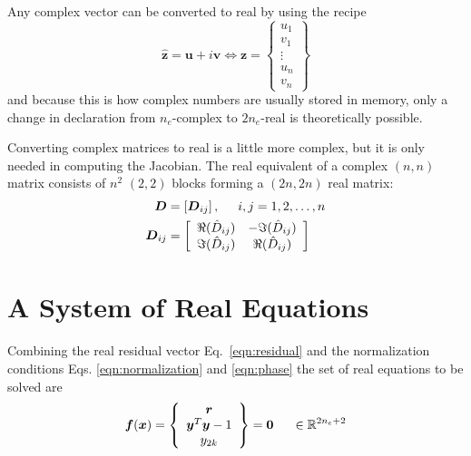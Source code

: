 \documentclass[10pt,openany,twoside]{book}
\numberwithin{equation}{section}   %
\newcommand{\Matrix}[1]{\boldsymbol{#1}}
\newcommand{\Vector}[1]{\boldsymbol{#1}}
\newcommand{\Eqn}[1]{Eq.\ \ref{#1}}
\newcommand{\Eqna}[2]{Eqs. \ref{#1} and \ref{#2}}
\begin{document}
Any complex vector can be converted to real by using the recipe
\begin{equation}\label{eqn:real-conversion}
\Vector{\hat{z}} = \Vector{u} + i\Vector{v}
	\Leftrightarrow \Vector{z} = \left\{ \begin{array}{c}
			u_1 \\
			v_1 \\
			\vdots \\
			u_{n} \\
			v_{n}
		\end{array} \right\}
\end{equation}
and because this is how complex numbers are usually stored in memory, only
a change in declaration from $n_e$-complex to $2n_e$-real is
theoretically possible.

Converting complex matrices to real is a little more complex, but it is only
needed in computing the Jacobian.
The real equivalent of a complex $(n,n)$ matrix consists of $n^2$ $(2,2)$
blocks forming a $(2n,2n)$ real matrix:
\begin{align}
	\Matrix{D} &= \left[\Matrix{D}_{ij} \right], \hspace{5mm}
			i, j = 1, 2, \ldots, n \nonumber \\
	\Matrix{D}_{ij} &= \left[ \begin{array}{cc}
		\Re(\hat{D}_{ij}) & -\Im(\hat{D}_{ij}) \\
		\Im(\hat{D}_{ij}) & \Re(\hat{D}_{ij})
	\end{array}\right]
\end{align}

\section{A System of Real Equations}
Combining the real residual vector \Eqn{eqn:residual} and the normalization conditions
\Eqna{eqn:normalization}{eqn:phase}
the set of real equations to be solved are
\begin{equation}\label{eqn:realeqn}
	\Vector{f}(\Vector{x}) = \left\{\begin{array}{c}
		\Vector{r} \\
		\Vector{y}^T\Vector{y} - 1 \\
		y_{2k} \\
	\end{array} \right\} = \Vector{0} \hspace{0.2in} \in \mathbb{R}^{2n_e+2} \nonumber \\
\end{equation}
\end{document}
